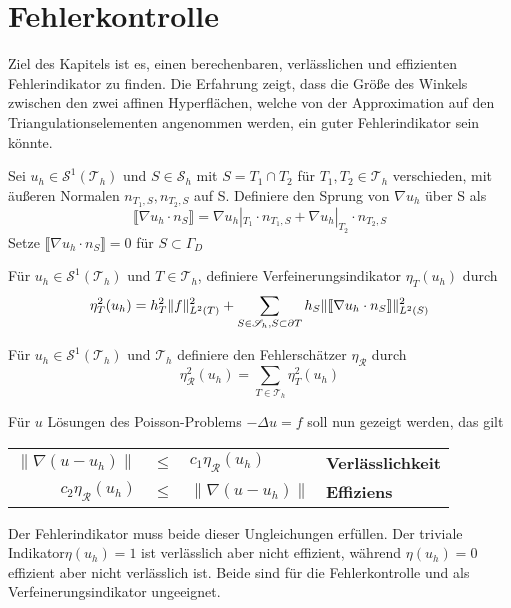 \chapter{Fehlerkontrolle}
Ziel des Kapitels ist es, einen berechenbaren, verlässlichen und effizienten Fehlerindikator zu finden. Die Erfahrung zeigt, dass die Größe des Winkels zwischen den zwei affinen Hyperflächen, welche von der Approximation auf den Triangulationselementen angenommen werden, ein guter Fehlerindikator sein könnte. 

\begin{definition}[Sprung]
	Sei $u_h\in\mathscr{S}^1(\mathscr{T}_h)$ und $S\in\mathscr{S}_h$ mit $S=T_1 \cap T_2$ für $T_1,T_2 \in \mathscr{T}_h$ verschieden, mit äußeren Normalen $n_{T_1,S},n_{T_2,S}$ auf S. Definiere den Sprung von $\nabla u_h$ über S als
	\[
	\llbracket \nabla u_h \cdot n_S\rrbracket = \nabla u_h|_{T_1} \cdot n_{T_1,S} + \nabla u_h|_{T_2} \cdot n_{T_2,S}
	\]
	Setze $\llbracket \nabla u_h \cdot n_S\rrbracket = 0$ f\"ur $S\subset \Gamma_D$
\end{definition}
\begin{definition}[Verfeinerungsindikator]
	Für $u_h \in \mathscr{S}^1(\mathscr{T}_h) \text{ und } T \in \mathscr{T}_h$, definiere Verfeinerungsindikator $\eta_T(u_h)$ durch
	\[
	\eta^2_T(u_h) = h^2_T\|f\|^2_{L^2(T)} + \sum_{S\in\mathscr{S}_h,S\subset\partial T} h_S\|\llbracket \nabla u_h \cdot n_S\rrbracket\|^2_{L^2(S)} \]
\end{definition}
\begin{definition}[Fehlerschätzer]
	Für $u_h \in \mathscr{S}^1(\mathscr{T}_h) \text{ und } \mathscr{T}_h$ definiere den Fehlerschätzer $\eta_\mathscr{R}$ durch
	\[
	\eta_\mathscr{R}^2(u_h)=\sum_{T\in\mathscr{T}_h} \eta^2_T(u_h)
	\]
\end{definition}
Für $u$ Lösungen des Poisson-Problems $-\Delta u = f$ soll nun gezeigt werden, das gilt \\
\begin{center}
	\begin{tabular}{r c l l}
		$\|\nabla(u-u_h)\|$ & $\leq$ & $c_1 \eta_\mathscr{R}(u_h)$ &\textbf{Verlässlichkeit} \\
		$c_2 \eta_\mathscr{R}(u_h)$ &$\leq$& $\|\nabla(u-u_h)\|$ &\textbf{Effiziens} \\
	\end{tabular}
\end{center}
Der Fehlerindikator muss beide dieser Ungleichungen erfüllen. Der triviale Indikator$\eta(u_h)=1$ ist verlässlich aber nicht effizient, während $\eta(u_h)=0$ effizient aber nicht verlässlich ist. Beide sind für die Fehlerkontrolle und als Verfeinerungsindikator ungeeignet.
